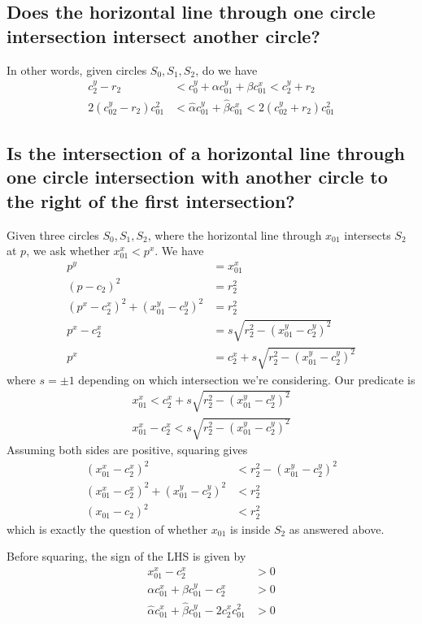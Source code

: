 \documentclass[11pt]{article}
\begin{document}
{\subsection{Does the horizontal line through one circle intersection intersect another circle?}

In other words, given circles $S_0, S_1, S_2$, do we have
\begin{align*}
c_2^y - r_2 &< c_0^y + \alpha c_{01}^y + \beta c_{01}^x < c_2^y + r_2 \\
2 (c_{02}^y - r_2) c_{01}^2 &< \hat{\alpha} c_{01}^y + \hat{\beta} c_{01}^x < 2 (c_{02}^y + r_2) c_{01}^2
\end{align*}

\subsection{Is the intersection of a horizontal line through one circle intersection with another circle to the right of the first intersection?}

Given three circles $S_0, S_1, S_2$, where the horizontal line through $x_{01}$ intersects $S_2$ at $p$, we ask whether $x_{01}^x < p^x$.  We have
\begin{align*}
p^y &= x_{01}^x \\
(p - c_2)^2 &= r_2^2 \\
(p^x - c_2^x)^2 + (x_{01}^y - c_2^y)^2 &= r_2^2 \\
p^x - c_2^x &= s \sqrt{r_2^2 - (x_{01}^y - c_2^y)^2} \\
p^x &= c_2^x + s \sqrt{r_2^2 - (x_{01}^y - c_2^y)^2}
\end{align*}
where $s = \pm 1$ depending on which intersection we're considering.  Our predicate is
\begin{align*}
x_{01}^x < c_2^x + s \sqrt{r_2^2 - (x_{01}^y - c_2^y)^2} \\
x_{01}^x - c_2^x < s \sqrt{r_2^2 - (x_{01}^y - c_2^y)^2}
\end{align*}
Assuming both sides are positive, squaring gives
\begin{align*}
(x_{01}^x - c_2^x)^2 &< r_2^2 - (x_{01}^y - c_2^y)^2 \\
(x_{01}^x - c_2^x)^2 + (x_{01}^y - c_2^y)^2 &< r_2^2 \\
(x_{01} - c_2)^2 &< r_2^2
\end{align*}
which is exactly the question of whether $x_{01}$ is inside $S_2$ as answered above.

Before squaring, the sign of the LHS is given by
\begin{align*}
x_{01}^x - c_2^x &> 0 \\
\alpha c_{01}^x + \beta c_{01}^y - c_2^x &> 0 \\
\hat{\alpha} c_{01}^x + \hat{\beta} c_{01}^y - 2 c_2^x c_{01}^2 &> 0
\end{align*}

}
\end{document}
